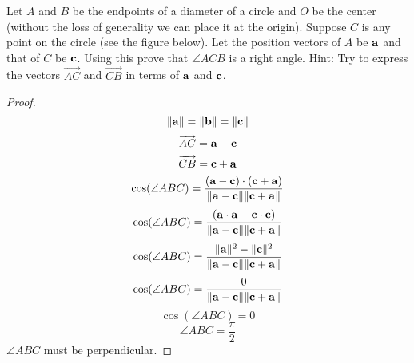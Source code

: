 \begin{problem}{\problemnum} 
Let $A$ and $B$ be the endpoints of a diameter of a circle and $O$ be the center (without the loss of generality we can place it at the origin). Suppose $C$ is any point on the circle (see the figure below). Let the position vectors of $A$ be $\mathbf{a}$ and that of $C$ be $\mathbf{c}$. Using this prove that $\angle ACB$ is a right angle. \textsf{Hint:} Try to express the vectors $\overrightarrow{AC}$ and $\overrightarrow{CB}$ in terms of $\mathbf{a}$ and $\mathbf{c}$.\\
\end{problem}
\begin{solution}
    \begin{proof}
        \[\lVert\mathbf{a}\rVert = \lVert\mathbf{b}\rVert = \lVert\mathbf{c}\rVert\]
        \[\overrightarrow{AC} = \mathbf{a} - \mathbf{c}\]
        \[\overrightarrow{CB} = \mathbf{c} + \mathbf{a}\]
        \[\cos(\angle ABC) = \frac{(\mathbf{a} - \mathbf{c}) \cdot (\mathbf{c} + \mathbf{a})}
                                  {\lVert\mathbf{a} - \mathbf{c}\rVert\lVert\mathbf{c} + \mathbf{a}\rVert}
                              \]
        \[\cos(\angle ABC) = \frac{(\mathbf{a} \cdot \mathbf{a} - \mathbf{c} \cdot \mathbf{c})}
                                  {\lVert\mathbf{a} - \mathbf{c}\rVert\lVert\mathbf{c} + \mathbf{a}\rVert}
        \]
        \[\cos(\angle ABC) = \frac{\lVert\mathbf{a}\rVert^2 - \lVert\mathbf{c}\rVert^2}
                                  {\lVert\mathbf{a} - \mathbf{c}\rVert\lVert\mathbf{c} + \mathbf{a}\rVert}
        \]
        \[\cos(\angle ABC) = \frac{0}
                                  {\lVert\mathbf{a} - \mathbf{c}\rVert\lVert\mathbf{c} + \mathbf{a}\rVert}
        \]
        \[\cos(\angle ABC) = 0\]
        \[\angle ABC = \frac{\pi}{2}\]
        $\angle ABC$ must be perpendicular.

    \end{proof}
\end{solution}
